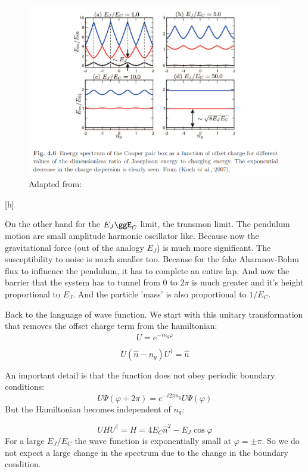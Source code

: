 \documentclass[12pt]{article}
\numberwithin{equation}{subsection}
\newcommand\ask[1]{
{%
}
}
\newcommand\page[1]{
{
}
}
\begin{document}
\begin{figure}[h]
\includegraphics[scale=0.6]{images/51-cpb-spectrum.png}
\caption{Adapted from: \cite{Girvin2015CircuitQS}}
\label{51-cpb-spectrum}
\end{figure}[h]

On the other hand for the $E_J\ggE_C$ limit, the transmon limit. The pendulum motion are small amplitude harmonic oscillator like. Because now the gravitational force (out of the analogy $E_J$) is much more significant. The susceptibility to noise is much smaller too. Because for the fake Aharanov-Bohm flux to influence the pendulum, it has to complete an entire lap. And now the barrier that the system has to tunnel from $0$ to $2\pi$ is much greater and it's height proportional to $E_J$. And the particle 'mass' is also proportional to $1/E_C$.

\page{53}
Back to the language of wave function. We start with this unitary transformation that removes the offset charge term from the hamiltonian:
\begin{equation}
    U = e^{-i n_g\varphi}
\end{equation}

\begin{equation}
    U(\hat n - n_g)U^\dagger = \hat n
\end{equation}

An important detail is that the function does not obey periodic boundary conditions:
\begin{equation}
    U\Psi(\varphi + 2\pi) = e^{-i2\pi n_g} U\Psi(\varphi)
\end{equation}
But the Hamiltonian becomes independent of $n_g$:

\begin{equation}
UHU^\dagger = H = 4E_C\hat n ^2 - E_J \cos \varphi
\end{equation}
For a large $E_J/E_C$ the wave function is exponentially small at $\varphi = \pm \pi$. So we do not expect a large change in the spectrum due to the change in the boundary condition.
\ask{Por que?}
\end{document}
